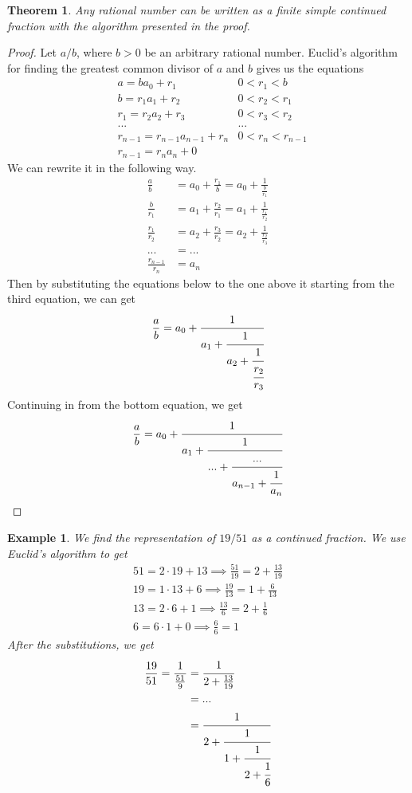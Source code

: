 \documentclass{article}
\newtheorem{theorem}{Theorem}[section]
\newtheorem{example}{Example}[section]
\theoremstyle{remark}
\theoremstyle{definition}
\begin{document}
\begin{theorem}
Any rational number can be written as a finite simple continued fraction with the algorithm presented in the proof. 
\end{theorem}
\begin{proof}
Let $a/b$, where $b >0$ be an arbitrary rational number. Euclid's algorithm for finding the greatest common divisor of $a$ and $b$ gives us the equations 
\begin{align*}
    &a = b a_0 + r_1 & 0 < r_1 < b \\
    &b = r_1 a_1 + r_2 & 0 < r_2 < r_1 \\
    &r_1 = r_2 a_2 + r_3 & 0 < r_3 < r_2 \\
    &... & ... \\
    &r_{n-1} = r_{n-1} a_{n-1} + r_n & 0 < r_n < r_{n-1} \\
    &r_{n-1} = r_n a_n + 0 & 
\end{align*}
We can rewrite it in the following way. 
\begin{align*}
    \frac{a}{b} &= a_0 + \frac{r_1}{b} = a_0 + \frac{1}{\frac{b}{r_1}} \\
    \frac{b}{r_1} &= a_1 + \frac{r_2}{r_1} = a_1 + \frac{1}{\frac{r_1}{r_2}} \\
    \frac{r_1}{r_2} &= a_2 + \frac{r_3}{r_2} = a_2 + \frac{1}{\frac{r_2}{r_3}} \\
    ... & = ... \\
    \frac{r_{n-1}}{r_n} &= a_n
\end{align*}
Then by substituting the equations below to the one above it starting from the third equation, we can get
\[\frac{a}{b} = a_0 + \cfrac{1}{a_1 + \cfrac{1}{a_2 + \cfrac{1}{\cfrac{r_2}{r_3}}}}\]
Continuing in from the bottom equation, we get
\[\frac{a}{b} = a_0 + \cfrac{1}{a_1 + \cfrac{1}{... + \cfrac{...}{a_{n-1} + \cfrac{1}{a_n}}}}\]
\end{proof}

\begin{example}
We find the representation of $19/51$ as a continued fraction. We use Euclid's algorithm to get
\begin{align*}
    51 = 2 \cdot 19 + 13 \implies \frac{51}{19} = 2 + \frac{13}{19} \\
    19 = 1 \cdot 13 + 6 \implies \frac{19}{13} = 1 + \frac{6}{13} \\
    13 = 2 \cdot 6 + 1 \implies \frac{13}{6} = 2 + \frac{1}{6} \\
    6 = 6 \cdot 1 + 0 \implies \frac{6}{6} = 1
\end{align*}
After the substitutions, we get
\begin{align*}
    \frac{19}{51} = \frac{1}{\frac{51}{9}} & = \cfrac{1}{2 + \frac{13}{19}} \\
    & = ... \\
    & = \cfrac{1}{2 + \cfrac{1}{1 + \cfrac{1}{2 + \cfrac{1}{6}}}}
\end{align*}
\end{example}
\end{document}
